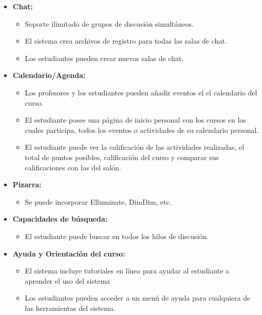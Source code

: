 	\begin{itemize}
		\item \textbf{Chat:}
			\begin{itemize}
				\item Soporte ilimitado de grupos de discusión simultáneos.
				\item El sistema crea archivos de registro para todas las salas de chat.
				\item Los estudiantes pueden crear nuevas salas de chat.
			\end{itemize}
	\end{itemize}
	\begin{itemize}
		\item \textbf{Calendario/Agenda:}
			\begin{itemize}
				\item Los profesores y los estudiantes pueden añadir eventos el el calendario del curso.
				\item El estudiante posee una página de inicio personal con los cursos en los cuales participa, todos los eventos o actividades de su calendario personal.
				\item El estudiante puede ver la calificación de las actividades realizadas, el total de puntos posibles, calificación del curso y comparar sus calificaciones con las del salón.
			\end{itemize}
	\end{itemize}
	\begin{itemize}
		\item \textbf{Pizarra:}
			\begin{itemize}
				\item Se puede incorporar Elluminate, DimDim, etc.
			\end{itemize}
	\end{itemize}
	\begin{itemize}
		\item \textbf{Capacidades de búsqueda:}
			\begin{itemize}
				\item El estudiante puede buscar en todos los hilos de discusión.
			\end{itemize}
	\end{itemize}
	\begin{itemize}
		\item \textbf{Ayuda y Orientación del curso:}
			\begin{itemize}
				\item El sistema incluye tutoriales en línea para ayudar al estudiante a aprender el uso del sistema
				\item Los estudiantes pueden acceder a un menú de ayuda para cualquiera de las herramientas del sistema.
			\end{itemize}
	\end{itemize}
